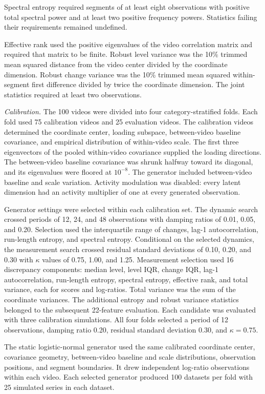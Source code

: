 \documentclass[
]{article}
\begin{document}
Spectral entropy required segments of at least eight observations with
positive total spectral power and at least two positive frequency
powers. Statistics failing their requirements remained undefined.

Effective rank used the positive eigenvalues of the video correlation
matrix and required that matrix to be finite. Robust level variance was
the 10\% trimmed mean squared distance from the video center divided by
the coordinate dimension. Robust change variance was the 10\% trimmed
mean squared within-segment first difference divided by twice the
coordinate dimension. The joint statistics required at least two
observations.

\emph{Calibration.} The 100 videos were divided into four
category-stratified folds. Each fold used 75 calibration videos and 25
evaluation videos. The calibration videos determined the coordinate
center, loading subspace, between-video baseline covariance, and
empirical distribution of within-video scale. The first three
eigenvectors of the pooled within-video covariance supplied the loading
directions. The between-video baseline covariance was shrunk halfway
toward its diagonal, and its eigenvalues were floored at \(10^{-8}\).
The generator included between-video baseline and scale variation.
Activity modulation was disabled: every latent dimension had an activity
multiplier of one at every generated observation.

Generator settings were selected within each calibration set. The
dynamic search crossed periods of 12, 24, and 48 observations with
damping ratios of 0.01, 0.05, and 0.20. Selection used the interquartile
range of changes, lag-1 autocorrelation, run-length entropy, and
spectral entropy. Conditional on the selected dynamics, the measurement
search crossed residual standard deviations of 0.10, 0.20, and 0.30 with
\(\kappa\) values of 0.75, 1.00, and 1.25. Measurement selection used 16
discrepancy components: median level, level IQR, change IQR, lag-1
autocorrelation, run-length entropy, spectral entropy, effective rank,
and total variance, each for scores and log-ratios. Total variance was
the sum of the coordinate variances. The additional entropy and robust
variance statistics belonged to the subsequent 22-feature evaluation.
Each candidate was evaluated with three calibration simulations. All
four folds selected a period of 12 observations, damping ratio 0.20,
residual standard deviation 0.30, and \(\kappa=0.75\).

The static logistic-normal generator used the same calibrated coordinate
center, covariance geometry, between-video baseline and scale
distributions, observation positions, and segment boundaries. It drew
independent log-ratio observations within each video. Each selected
generator produced 100 datasets per fold with 25 simulated series in
each dataset.
\end{document}
